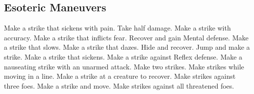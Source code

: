 
\small
\subsection{Esoteric Maneuvers}\label{Esoteric Maneuvers}
\begin{spelllist}
 Make a strike that sickens with pain.
 Take half damage.
 Make a strike with  accuracy.
 Make a strike that inflicts fear.
 Recover and gain  Mental defense.
 Make a strike that slows.
 Make a strike that dazes.
 Hide and recover.
 Jump and make a strike.
 Make a strike that sickens.
 Make a strike against Reflex defense.
 Make a nauseating strike with an unarmed attack.
 Make two strikes.
 Make strikes while moving in a line.
 Make a strike at a creature to recover.
 Make strikes against three foes.
 Make a strike and move.
 Make strikes against all threatened foes.
\end{spelllist}



\small
